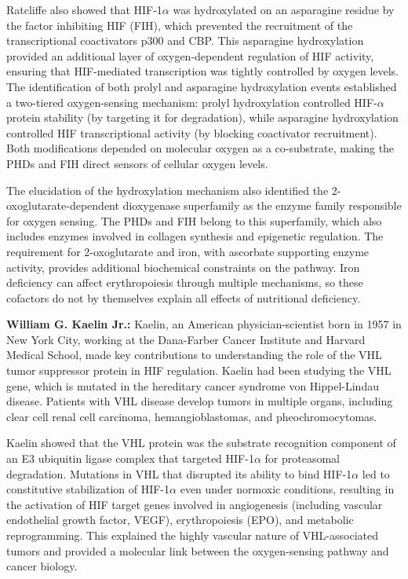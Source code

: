 Ratcliffe also showed that HIF-1$\alpha$ was hydroxylated on an asparagine residue by the factor inhibiting HIF (FIH), which prevented the recruitment of the transcriptional coactivators p300 and CBP. This asparagine hydroxylation provided an additional layer of oxygen-dependent regulation of HIF activity, ensuring that HIF-mediated transcription was tightly controlled by oxygen levels. The identification of both prolyl and asparagine hydroxylation events established a two-tiered oxygen-sensing mechanism: prolyl hydroxylation controlled HIF-$\alpha$ protein stability (by targeting it for degradation), while asparagine hydroxylation controlled HIF transcriptional activity (by blocking coactivator recruitment). Both modifications depended on molecular oxygen as a co-substrate, making the PHDs and FIH direct sensors of cellular oxygen levels.

The elucidation of the hydroxylation mechanism also identified the 2-oxoglutarate-dependent dioxygenase superfamily as the enzyme family responsible for oxygen sensing. The PHDs and FIH belong to this superfamily, which also includes enzymes involved in collagen synthesis and epigenetic regulation. The requirement for 2-oxoglutarate and iron, with ascorbate supporting enzyme activity, provides additional biochemical constraints on the pathway. Iron deficiency can affect erythropoiesis through multiple mechanisms, so these cofactors do not by themselves explain all effects of nutritional deficiency.

\textbf{William G. Kaelin Jr.:} Kaelin, an American physician-scientist born in 1957 in New York City, working at the Dana-Farber Cancer Institute and Harvard Medical School, made key contributions to understanding the role of the VHL tumor suppressor protein in HIF regulation. Kaelin had been studying the VHL gene, which is mutated in the hereditary cancer syndrome von Hippel-Lindau disease. Patients with VHL disease develop tumors in multiple organs, including clear cell renal cell carcinoma, hemangioblastomas, and pheochromocytomas.

Kaelin showed that the VHL protein was the substrate recognition component of an E3 ubiquitin ligase complex that targeted HIF-1$\alpha$ for proteasomal degradation. Mutations in VHL that disrupted its ability to bind HIF-1$\alpha$ led to constitutive stabilization of HIF-1$\alpha$ even under normoxic conditions, resulting in the activation of HIF target genes involved in angiogenesis (including vascular endothelial growth factor, VEGF), erythropoiesis (EPO), and metabolic reprogramming. This explained the highly vascular nature of VHL-associated tumors and provided a molecular link between the oxygen-sensing pathway and cancer biology.


